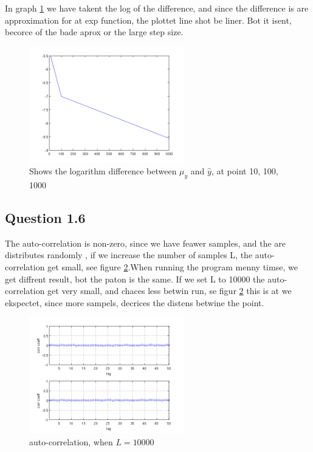 \documentclass[a4paper, 10pt, final]{article}
\begin{document}
In graph \ref{fig:q5_log} we have takent the log of the difference, and
since the difference is are approximation for at exp function, the
plottet line shot be liner. Bot it isent, becorce of the bade aprox or
the large step size.

\begin{figure}[!ht]
  \centering
  \includegraphics[width=0.6\textwidth]{images/q5_L10_L100_L1000_log}
  \caption{Shows the logarithm difference between $\mu _y$ and $\hat{y}$, at point 10, 100, 1000}
  \label{fig:q5_log}
\end{figure}

\subsection*{Question 1.6}

The auto-correlation is non-zero, since we have feawer samples, and the
are distributes randomly , if we increase the number of samples L, the
auto-correlation get small, see figure \ref{L10000}.When running the
program menny timse, we get diffrent result, bot the paton is the same.
If we set L to 10000 the auto-correlation get very small, and chaces
less betwin run, se figur \ref{L10000} this is at we ekspectet, since
more sampels, decrices the distens betwine the point.

\begin{figure}[!ht]
  \centering
  \includegraphics[width=0.6\textwidth]{images/L10000}
  \caption{auto-correlation, when $L = 10000$}
  \label{L10000}
\end{figure}
\newpage
\newpage
\newpage
\newpage
\newpage
\end{document}
